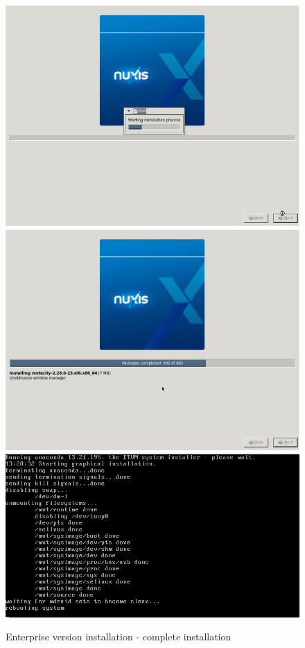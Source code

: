 \begin{figure}[H]
	\begin{center}
	\includegraphics[scale=0.2]{screenshots/install/nuxis/start_install.png}
	\includegraphics[scale=0.2]{screenshots/install/nuxis/install_progress_02.png}
	\includegraphics[scale=0.4]{screenshots/install/nuxis/install_reboot.png}
    \caption{Enterprise version installation - complete installation}
	\label{fig:installation_enterprise_06}
	\end{center}
\end{figure}

